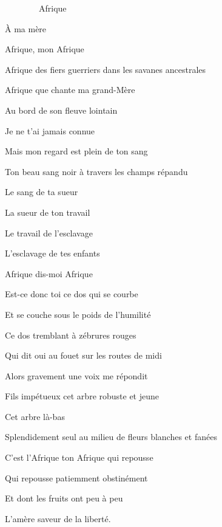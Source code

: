 {

\setlength{\parskip}{0pt}

\ \ \ \ \ \ \ \ Afrique

{\raggedleft
À ma mère
\par}

Afrique, mon Afrique

Afrique des fiers guerriers dans les savanes ancestrales

Afrique que chante ma grand-Mère

Au bord de son fleuve lointain

Je ne t'ai jamais connue

Mais mon regard est plein de ton sang

Ton beau sang noir à travers les champs répandu

Le sang de ta sueur

La sueur de ton travail

Le travail de l'esclavage

L'esclavage de tes enfants

Afrique dis-moi Afrique

Est-ce donc toi ce dos qui se courbe

Et se couche sous le poids de l'humilité

Ce dos tremblant à zébrures rouges

Qui dit oui au fouet sur les routes de midi

Alors gravement une voix me répondit

Fils impétueux cet arbre robuste et jeune

Cet arbre là-bas

Splendidement seul au milieu de fleurs blanches et fanées

C'est l'Afrique ton Afrique qui repousse

Qui repousse patiemment obstinément

Et dont les fruits ont peu à peu

L'amère saveur de la liberté.

\setlength{\parskip}{6pt}
}

